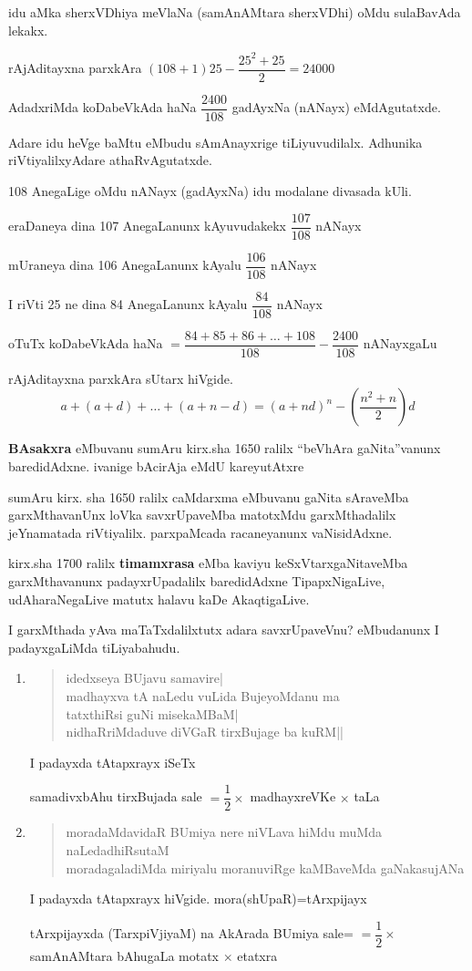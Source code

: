 idu aMka sherxVDhiya meVlaNa (samAnAMtara sherxVDhi) oMdu sulaBavAda lekakx.

rAjAditayxna parxkAra \quad $(108+1)25-\dfrac{25^2+25}{2}=24000$

AdadxriMda koDabeVkAda haNa \quad $\dfrac{2400}{108}$ \quad gadAyxNa (nANayx) eMdAgutatxde.

Adare idu heVge baMtu eMbudu sAmAnayxrige tiLiyuvudilalx. Adhunika riVtiyalilxyAdare athaRvAgutatxde.

{\rm 108} AnegaLige oMdu nANayx (gadAyxNa) idu modalane divasada kUli.

eraDaneya dina {\rm 107} AnegaLanunx kAyuvudakekx \quad $\dfrac{107}{108}$ \quad  nANayx

mUraneya dina {\rm 106} AnegaLanunx kAyalu \quad $\dfrac{106}{108}$ nANayx

I riVti {\rm 25} ne dina {\rm 84} AnegaLanunx kAyalu $\dfrac{84}{108}$ nANayx

oTuTx koDabeVkAda haNa \quad $=\dfrac{84+85+86+\ldots+108}{108}-\dfrac{2400}{108}$ \quad nANayxgaLu

rAjAditayxna parxkAra sUtarx hiVgide.
$$
a+(a+d)+\ldots+(a+n-d)
=(a+nd)^n-(\dfrac{n^2+n}{2})d
$$

\textbf{BAsakxra} eMbuvanu sumAru kirx.sha {\rm 1650} ralilx ``beVhAra gaNita''vanunx baredidAdxne. ivanige bAcirAja eMdU kareyutAtxre 

sumAru kirx. sha {\rm 1650} ralilx caMdarxma eMbuvanu gaNita sAraveMba garxMthavanUnx loVka savxrUpaveMba matotxMdu garxMthadalilx jeYnamatada riVtiyalilx. parxpaMcada racaneyanunx vaNisidAdxne.

kirx.sha {\rm1700} ralilx \textbf{timamxrasa} eMba kaviyu keSxVtarxgaNitaveMba garxMthavanunx padayxrUpadalilx baredidAdxne TipapxNigaLive, udAharaNegaLive matutx halavu kaDe AkaqtigaLive.

I garxMthada yAva maTaTxdalilxtutx adara savxrUpaveVnu? eMbudanunx I padayxgaLiMda tiLiyabahudu.
\begin{enumerate}[\rm 1)]
\item 
\begin{verse}
idedxseya BUjavu samavire|\\
madhayxva tA naLedu vuLida BujeyoMdanu ma\\
tatxthiRsi guNi misekaMBaM|\\
nidhaRriMdaduve diVGaR tirxBujage ba kuRM||
\end{verse}
I padayxda tAtapxrayx iSeTx 

samadivxbAhu tirxBujada sale \quad $=\dfrac{1}{2}\times$ \quad madhayxreVKe \quad $\times$ \quad taLa

\item 
\begin{verse}
moradaMdavidaR BUmiya nere niVLava hiMdu muMda naLedadhiRsutaM\\
moradagaladiMda miriyalu moranuviRge kaMBaveMda gaNakasujANa
\end{verse}

I padayxda tAtapxrayx hiVgide. mora(shUpaR)=tArxpijayx

tArxpijayxda (TarxpiVjiyaM) na AkArada BUmiya sale= $=\dfrac{1}{2}\times$ samAnAMtara bAhugaLa motatx $\times$ etatxra
\end{enumerate}

